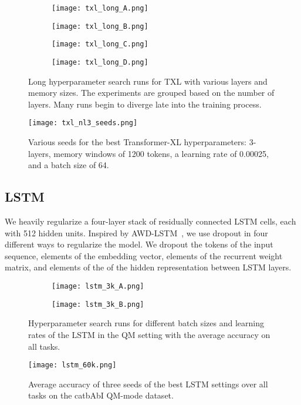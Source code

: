 \documentclass{article} \usepackage{iclr2021_conference,times}
\begin{document}
\begin{figure}[H]
  \centering
  \vspace{-10pt}
  \begin{subfigure}[b]{.49\linewidth}
    \texttt{[image: txl\_long\_A.png]}
  \end{subfigure}
  \begin{subfigure}[b]{.49\linewidth}
    \texttt{[image: txl\_long\_B.png]}
  \end{subfigure}
  \begin{subfigure}[b]{.49\linewidth}
    \texttt{[image: txl\_long\_C.png]}
  \end{subfigure}
  \begin{subfigure}[b]{.49\linewidth}
    \texttt{[image: txl\_long\_D.png]}
  \end{subfigure}
  \caption{Long hyperparameter search runs for TXL with various layers and memory sizes. The experiments are grouped based on the number of layers. Many runs begin to diverge late into the training process.}
  \label{appendix:fig:txl_long}
\end{figure}

\begin{figure}[H]
  \centering
  \vspace{-10pt}
  \texttt{[image: txl\_nl3\_seeds.png]}
  \caption{Various seeds for the best Transformer-XL hyperparameters: 3-layers, memory windows of 1200 tokens, a learning rate of 0.00025, and a batch size of 64.}
  \label{appendix:fig:txl_nl3_seeds}
\end{figure}


\subsection{LSTM}
We heavily regularize a four-layer stack of residually connected LSTM cells, each with 512 hidden units. Inspired by AWD-LSTM~\citep{merity2018regularizing}, we use dropout in four different ways to regularize the model. We dropout the tokens of the input sequence, elements of the embedding vector, elements of the recurrent weight matrix, and elements of the of the hidden representation between LSTM layers.
\begin{figure}[H]
  \centering
\begin{subfigure}[b]{.49\linewidth}
    \texttt{[image: lstm\_3k\_A.png]}
  \end{subfigure}
  \begin{subfigure}[b]{.49\linewidth}
    \texttt{[image: lstm\_3k\_B.png]}
  \end{subfigure}
  \caption{Hyperparameter search runs for different batch sizes and learning rates of the LSTM in the QM setting with the average accuracy on all tasks.}
  \label{appendix:fig:lstm3k}
\end{figure}
\begin{figure}[H]
  \centering
\texttt{[image: lstm\_60k.png]}
  \caption{Average accuracy of three seeds of the best LSTM settings over all tasks on the catbAbI QM-mode dataset.}
  \label{appendix:fig:lstm60k}
\end{figure}
\end{document}
